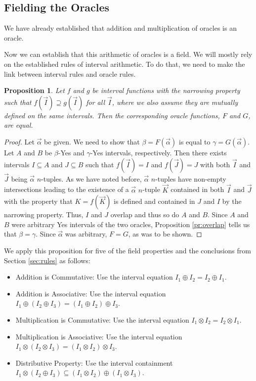 \documentclass[12pt]{article}
\newtheorem{proposition}{Proposition}[subsection]
\theoremstyle{remark}
\begin{document}
\subsection{Fielding the Oracles}

We have already established that addition and multiplication of oracles is an oracle. 


Now we can establish that this arithmetic of oracles is a field. We will mostly rely on the established rules of interval arithmetic. To do that, we need to make the link between interval rules and oracle rules. 


\begin{proposition}
Let $f$ and $g$ be interval functions with the narrowing property such that $f(\vec{I}) \supseteq g(\vec{I})$ for all $\vec{I}$, where we also assume they are mutually defined on the same intervals. Then the corresponding oracle functions, $F$ and $G$, are equal.  
\end{proposition}

\begin{proof}
Let $\vec{\alpha}$ be given. We need to show that $\beta = F(\vec{\alpha})$ is equal to $\gamma =  G(\vec{\alpha})$. Let $A$ and $B$ be $\beta$-Yes and $\gamma$-Yes intervals, respectively. Then there exists intervals $I \subseteq A$ and  $J \subseteq B$  such that $f(\vec{I}) = I$ and $f(\vec{J}) = J$ with both  $\vec{I}$ and $\vec{J}$ being $\vec{\alpha}$ $n$-tuples. As we have noted before, $\vec{\alpha}$ $n$-tuples have non-empty intersections leading to the existence of a $\vec{\alpha}$ $n$-tuple $\vec{K}$ contained in both $\vec{I}$ and $\vec{J}$ with the property that $K = f(\vec{K})$ is defined and contained in $J$ and $I$ by the narrowing property. Thus, $I$ and $J$ overlap and thus so do $A$ and $B$. Since $A$ and $B$ were arbitrary Yes intervals of the two oracles, Proposition \ref{pr:overlap} tells us that $\beta = \gamma$. Since $\vec{\alpha}$ was arbitrary, $F = G$, as was to be shown.
\end{proof}

We apply this proposition for five of the field properties and the conclusions from Section \ref{sec:rules} as follows: 

\begin{itemize}
    \item Addition is Commutative:  Use the interval equation $I_1 \oplus I_2 = I_2 \oplus I_1$.
    \item Addition is Associative: Use the interval equation $I_1 \oplus (I_2 \oplus I_3) = (I_1 \oplus I_2) \oplus I_3$.
    \item Multiplication is Commutative: Use the interval equation $I_1 \otimes I_2 = I_2 \otimes I_1$.
    \item Multiplication is Associative: Use the interval equation $I_1 \otimes (I_2 \otimes I_3) = (I_1 \otimes I_2) \otimes I_3$.
    \item Distributive Property: Use the interval containment $I_1 \otimes (I_2 \oplus I_3) \subseteq (I_1 \otimes I_2) \oplus (I_1 \otimes I_3)$.
\end{itemize}
\end{document}
